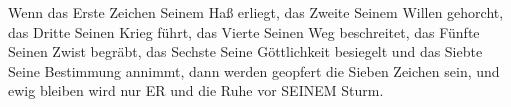 Wenn das Erste Zeichen Seinem Haß erliegt, das Zweite Seinem Willen gehorcht, das Dritte Seinen Krieg führt, das Vierte Seinen Weg beschreitet, das Fünfte Seinen Zwist begräbt, das Sechste Seine Göttlichkeit besiegelt und das Siebte Seine Bestimmung annimmt, dann werden geopfert die Sieben Zeichen sein, und ewig bleiben wird nur ER und die Ruhe vor SEINEM Sturm. 









